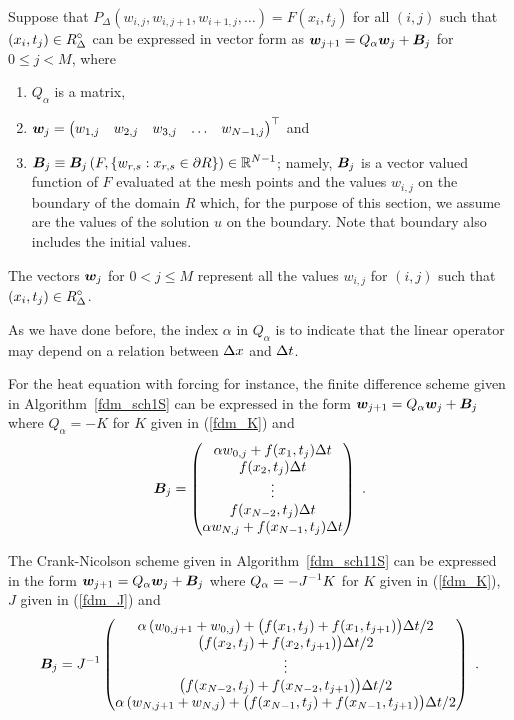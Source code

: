 Suppose that
$P_\Delta(w_{i,j},w_{i,j+1},w_{i+1,j}, \ldots) = F(x_i,t_j)$ for all
$(i,j)$ such that $\displaystyle (x_i,t_j) \in R^\circ_\Delta$ can be expressed
in vector form as $\bm{w}_{j+1} = Q_\alpha\bm{w}_j + \bm{B}_j$
for $0 \leq j < M$, where
\begin{enumerate}
\item $Q_\alpha$ is a  matrix,
\item $\displaystyle \bm{w}_j = \begin{pmatrix}
w_{1,j} & w_{2,j} & w_{3,j} & \ldots & w_{N-1,j} \end{pmatrix}^\top$
and
\item $\displaystyle \bm{B}_j
\equiv \bm{B}_j\left(F,\{w_{r,s}:x_{r,s} \in \partial R\}\right) \in \mathbb{R}^{N-1}$;
namely, $\bm{B}_j$ is a vector valued function of $F$ evaluated at
the mesh points and the values $w_{i,j}$ on the boundary
of the domain $R$ which, for the purpose of this section, we assume
are the values of the solution $u$ on the boundary.  Note that
boundary also includes the initial values.
\end{enumerate}
The vectors $\bm{w}_j$ for $0<j\leq M$ represent all
the values $w_{i,j}$ for $(i,j)$ such that
$\displaystyle (x_i,t_j) \in R^\circ_\Delta$.

As we have done before, the index $\alpha$ in $Q_\alpha$ is to indicate
that the linear operator may depend on a relation between $\Delta{x}$
and $\Delta{t}$.

\begin{egg}
For the heat equation with forcing for instance,
the finite difference scheme given in Algorithm~\ref{fdm_sch1S} can be
expressed in the form $\bm{w}_{j+1} = Q_\alpha\bm{w}_j + \bm{B}_j$ where
$Q_\alpha = -K$ for $K$ given in (\ref{fdm_K}) and
\[
\bm{B}_j = \begin{pmatrix}
\alpha w_{0,j} + f(x_1,t_j) \Delta{t} \\
f(x_2,t_j) \Delta{t} \\
\vdots \\
f(x_{N-2},t_j) \Delta{t} \\
\alpha w_{N,j} + f(x_{N-1},t_j) \Delta{t}
\end{pmatrix} \ .
\]

The Crank-Nicolson scheme given in Algorithm~\ref{fdm_sch11S} can
be expressed in the form $\bm{w}_{j+1} = Q_\alpha\bm{w}_j + \bm{B}_j$ where
$\displaystyle Q_\alpha = -J^{-1}K$ for $K$ given in (\ref{fdm_K}), $J$ given in
(\ref{fdm_J}) and
\[
\bm{B}_j = J^{-1} \begin{pmatrix}
\alpha \left( w_{0,j+1} + w_{0,j} \right)
+ \big( f(x_1,t_j) + f(x_1,t_{j+1}) \big)\Delta{t}/2 \\
\big( f(x_2,t_j) + f(x_2,t_{j+1}) \big)\Delta{t}/2 \\
\vdots \\
\big( f(x_{N-2},t_j) + f(x_{N-2},t_{j+1}) \big)\Delta{t}/2 \\
\alpha \left( w_{N,j+1} + w_{N,j} \right)
+ \big( f(x_{N-1},t_j)  + f(x_{N-1},t_{j+1}) \big)\Delta{t}/2
\end{pmatrix} \ .
\]
\label{Moreell2StabEgg}
\end{egg}


